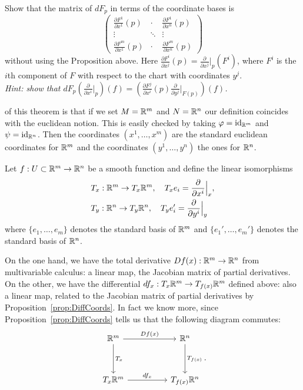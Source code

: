 \begin{exercise}
  Show that the matrix of $d F_p$ in terms of the coordinate bases is 
  \begin{equation}
    \begin{pmatrix}
      \frac{\partial F^1}{\partial x^1} (p) & \cdot & \frac{\partial F^1}{\partial x^n} (p) \\
      \vdots & \ddots & \vdots \\
      \frac{\partial F^m}{\partial x^1} (p) & \cdot & \frac{\partial F^m}{\partial x^n} (p)
    \end{pmatrix}
  \end{equation}
  without using the Proposition above. Here $\frac{\partial F^i}{\partial x^j} (p) = \frac{\partial}{\partial x^j}\big|_p (F^i)$, where $F^i$ is the $i$th component of $F$ with respect to the chart with coordinates $y^j$.\\
  \textit{\small Hint: show that $d F_p \left(\frac{\partial}{\partial x^i}\big|_p\right) (f) = \left(\frac{\partial F^j}{\partial x^i} (p) \frac{\partial}{\partial y^j}\big|_{F(p)}\right) (f)$.}
\end{exercise}

 of this theorem is that if we set $M=\mathbb{R}^m$ and $N=\mathbb{R}^n$ our definition coincides with the euclidean notion.
This is easily checked by taking $\varphi = \operatorname{id}_{\mathbb{R}^m}$ and $\psi=\operatorname{id}_{\mathbb{R}^n}$.
Then the coordinates $(x^1,\ldots,x^m)$ are the standard euclidean coordinates for $\mathbb{R}^m$ and the coordinates $(y^1,\ldots,y^n)$ the ones for $\mathbb{R}^n$.

Let $f:U\subset\mathbb{R}^m\to\mathbb{R}^n$ be a smooth function and define the linear isomorphisms
\begin{align}\label{def:lin_iso_Tp}
  &T_x : \mathbb{R}^m \to T_x\mathbb{R}^m,\quad T_x e_i = \frac{\partial}{\partial x^i}\Big|_x,\\
  &T_y : \mathbb{R}^n \to T_y\mathbb{R}^n,\quad T_y e_i' = \frac{\partial}{\partial y^i}\Big|_y
\end{align}
where $\{e_1,\ldots,e_m\}$ denotes the standard basis of $\mathbb{R}^m$ and $\{e_1',\ldots,e_m'\}$ denotes the standard basis of $\mathbb{R}^n$.

On the one hand, we have the total derivative $Df(x):\mathbb{R}^m\to\mathbb{R}^n$ from multivariable calculus: a linear map, the Jacobian matrix of partial derivatives.
On the other, we have the differential $df_x : T_x \mathbb{R}^m \to T_{f(x)}\mathbb{R}^m$ defined above: also a linear map, related to the Jacobian matrix of partial derivatives by Proposition~\ref{prop:DiffCoords}.
In fact we know more, since Proposition~\ref{prop:DiffCoords} tells us that the following diagram commutes:
\begin{equation}
  \begin{tikzcd}[row sep=huge, column sep=huge]
    \R^m \arrow[r, "Df(x)"] \arrow[d, "T_x"]
    & \R^n \arrow[d, "T_{f(x)}"] \\
    T_x\R^m \arrow[r, "df_x"]
    & T_{f(x)}\R^n
  \end{tikzcd}.
\end{equation}

